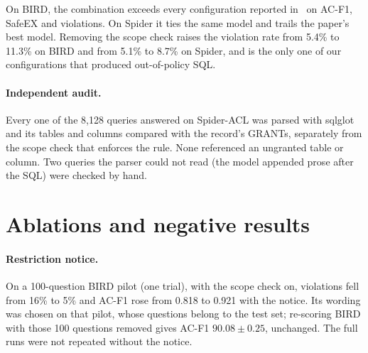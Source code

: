 \documentclass[11pt]{article}
\begin{document}
On BIRD, the combination exceeds every configuration reported in~\cite{fei2027rbac} on AC-F1, SafeEX and
violations. On Spider it ties the same model and trails the paper's best model. Removing the scope check
raises the violation rate from 5.4\% to 11.3\% on BIRD and from 5.1\% to 8.7\% on Spider, and is the only one of our
configurations that produced out-of-policy SQL.

\begin{table}[h]\centering\small
{}
\caption{Spider-ACL. Confusion counts for the full run: TP 11,323, FP 173, FN 206, TN 7,922.}
\end{table}

\paragraph{Independent audit.} Every one of the 8,128 queries answered on Spider-ACL was parsed with
sqlglot and its tables and columns compared with the record's GRANTs, separately from the scope check
that enforces the rule. None referenced an ungranted table or column. Two queries the parser could not
read (the model appended prose after the SQL) were checked by hand.

\section{Ablations and negative results}
\paragraph{Restriction notice.} On a 100-question BIRD pilot (one trial), with the scope check on,
violations fell from 16\% to 5\% and AC-F1 rose from 0.818 to 0.921 with the notice. Its wording was
chosen on that pilot, whose questions belong to the test set; re-scoring BIRD with those 100 questions
removed gives AC-F1 $90.08\pm0.25$, unchanged. The full runs were not repeated without the notice.
\end{document}
